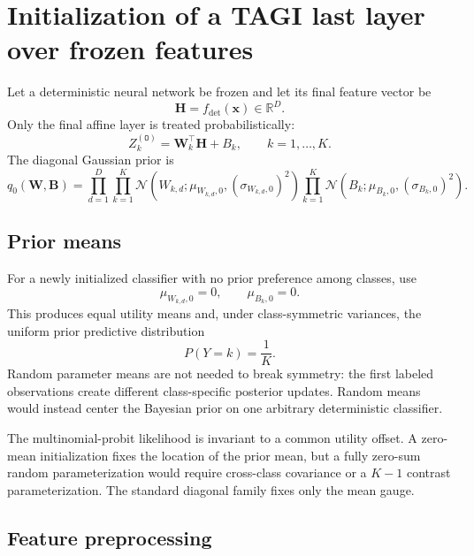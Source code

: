 \documentclass[11pt]{article}
\newcommand{\Normal}{\mathcal{N}}
\newcommand{\trans}{\intercal}
\newcommand{\Olayer}{\mathtt{O}}
\begin{document}
\section{Initialization of a TAGI last layer over frozen features}
\label{sec:initialization}

Let a deterministic neural network be frozen and let its final feature vector
be
\begin{equation}
 \bm H=f_{\mathrm{det}}(\bm x)\in\mathbb R^D.
\end{equation}
Only the final affine layer is treated probabilistically:
\begin{equation}
 Z_k^{(\Olayer)}
 =
 \bm W_k^\trans\bm H+B_k,
 \qquad k=1,\ldots,K.
 \label{eq:frozen-last-layer}
\end{equation}
The diagonal Gaussian prior is
\begin{equation}
 q_0(\bm W,\bm B)
 =
 \prod_{d=1}^{D}\prod_{k=1}^{K}
 \Normal(W_{k,d};\mu_{W_{k,d},0},(\sigma_{W_{k,d},0})^2)
 \prod_{k=1}^{K}
 \Normal(B_k;\mu_{B_k,0},(\sigma_{B_k,0})^2).
 \label{eq:last-layer-prior}
\end{equation}

\subsection{Prior means}

For a newly initialized classifier with no prior preference among classes, use
\begin{equation}
 \boxed{
 \mu_{W_{k,d},0}=0,
 \qquad
 \mu_{B_k,0}=0.}
 \label{eq:zero-prior-means}
\end{equation}
This produces equal utility means and, under class-symmetric variances, the
uniform prior predictive distribution
\begin{equation}
 P(Y=k)=\frac{1}{K}.
\end{equation}
Random parameter means are not needed to break symmetry: the first labeled
observations create different class-specific posterior updates.  Random means
would instead center the Bayesian prior on one arbitrary deterministic
classifier.

The multinomial-probit likelihood is invariant to a common utility offset.  A
zero-mean initialization fixes the location of the prior mean, but a fully
zero-sum random parameterization would require cross-class covariance or a
$K-1$ contrast parameterization.  The standard diagonal family fixes only the
mean gauge.

\subsection{Feature preprocessing}
\end{document}
